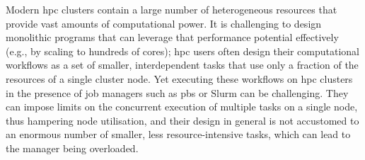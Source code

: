 Modern \gls{hpc} clusters contain a large number of heterogeneous resources that
provide vast amounts of computational power. It is challenging to design monolithic programs that
can leverage that performance potential effectively (e.g., by scaling to hundreds of cores);
\gls{hpc} users often design their computational workflows as a set of smaller,
interdependent tasks that use only a fraction of the resources of a single cluster node. Yet
executing these workflows on \gls{hpc} clusters in the presence of job managers such as
\gls{pbs} or Slurm can be challenging. They can impose limits on the concurrent
execution of multiple tasks on a single node, thus hampering node utilisation, and their design in
general is not accustomed to an enormous number of smaller, less resource-intensive tasks, which
can lead to the manager being overloaded.
